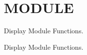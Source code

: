 \hypertarget{group__SN3D}{}\section{M\+O\+D\+U\+LE}
\label{group__SN3D}


Display Module Functions.  


Display Module Functions. 

